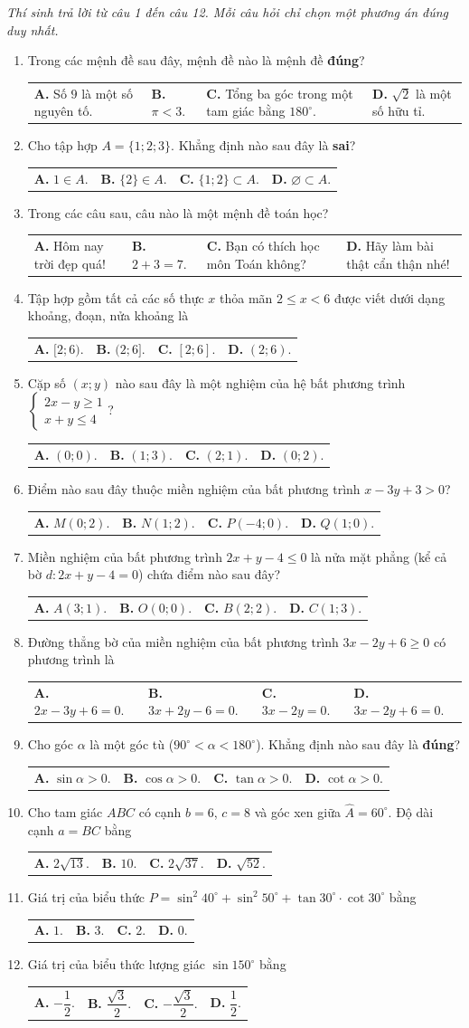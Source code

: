 \documentclass[12pt,a4paper]{article}
\makeatletter
\newcommand{\parttitle}[1]{\par\vspace{2pt}{\large\bfseries\color{ink}#1}\par\vspace{1pt}}
\newcommand{\four}[4]{\par\noindent\begin{tabularx}{\linewidth}{@{}*{4}{>{\raggedright\arraybackslash}X}@{}}\textbf{A.} #1&\textbf{B.} #2&\textbf{C.} #3&\textbf{D.} #4\end{tabularx}}
\makeatother
\begin{document}
\parttitle{PHẦN I. Trắc nghiệm nhiều lựa chọn}
\textit{Thí sinh trả lời từ câu 1 đến câu 12. Mỗi câu hỏi chỉ chọn một phương án đúng duy nhất.}
\begin{enumerate}
\item Trong các mệnh đề sau đây, mệnh đề nào là mệnh đề \textbf{đúng}?
\four{Số $9$ là một số nguyên tố.}{$\pi < 3$.}{Tổng ba góc trong một tam giác bằng $180^\circ$.}{$\sqrt{2}$ là một số hữu tỉ.}

\item Cho tập hợp $A = \{1; 2; 3\}$. Khẳng định nào sau đây là \textbf{sai}?
\four{$1 \in A$.}{$\{2\} \in A$.}{$\{1; 2\} \subset A$.}{$\varnothing \subset A$.}

\item Trong các câu sau, câu nào là một mệnh đề toán học?
\four{Hôm nay trời đẹp quá!}{$2 + 3 = 7$.}{Bạn có thích học môn Toán không?}{Hãy làm bài thật cẩn thận nhé!}

\item Tập hợp gồm tất cả các số thực $x$ thỏa mãn $2 \le x < 6$ được viết dưới dạng khoảng, đoạn, nửa khoảng là
\four{$[2; 6)$.}{$(2; 6]$.}{$[2; 6]$.}{$(2; 6)$.}

\item Cặp số $(x; y)$ nào sau đây là một nghiệm của hệ bất phương trình $\begin{cases} 2x - y \ge 1 \\ x + y \le 4 \end{cases}$?
\four{$(0; 0)$.}{$(1; 3)$.}{$(2; 1)$.}{$(0; 2)$.}

\item Điểm nào sau đây thuộc miền nghiệm của bất phương trình $x - 3y + 3 > 0$?
\four{$M(0; 2)$.}{$N(1; 2)$.}{$P(-4; 0)$.}{$Q(1; 0)$.}

\item Miền nghiệm của bất phương trình $2x + y - 4 \le 0$ là nửa mặt phẳng (kể cả bờ $d: 2x + y - 4 = 0$) chứa điểm nào sau đây?
\four{$A(3; 1)$.}{$O(0; 0)$.}{$B(2; 2)$.}{$C(1; 3)$.}

\item Đường thẳng bờ của miền nghiệm của bất phương trình $3x - 2y + 6 \ge 0$ có phương trình là
\four{$2x - 3y + 6 = 0$.}{$3x + 2y - 6 = 0$.}{$3x - 2y = 0$.}{$3x - 2y + 6 = 0$.}

\item Cho góc $\alpha$ là một góc tù ($90^\circ < \alpha < 180^\circ$). Khẳng định nào sau đây là \textbf{đúng}?
\four{$\sin \alpha > 0$.}{$\cos \alpha > 0$.}{$\tan \alpha > 0$.}{$\cot \alpha > 0$.}

\item Cho tam giác $ABC$ có cạnh $b = 6$, $c = 8$ và góc xen giữa $\widehat{A} = 60^\circ$. Độ dài cạnh $a = BC$ bằng
\four{$2\sqrt{13}$.}{$10$.}{$2\sqrt{37}$.}{$\sqrt{52}$.}

\item Giá trị của biểu thức $P = \sin^2 40^\circ + \sin^2 50^\circ + \tan 30^\circ \cdot \cot 30^\circ$ bằng
\four{$1$.}{$3$.}{$2$.}{$0$.}

\item Giá trị của biểu thức lượng giác $\sin 150^\circ$ bằng
\four{$-\dfrac{1}{2}$.}{$\dfrac{\sqrt{3}}{2}$.}{$-\dfrac{\sqrt{3}}{2}$.}{$\dfrac{1}{2}$.}
\end{enumerate}
\end{document}

